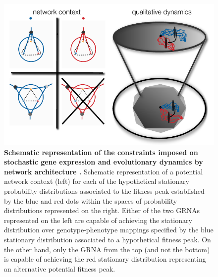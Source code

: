 \begin{figure}[!ht]
\centering
\noindent\includegraphics[width=0.9\columnwidth]{fig/stochdynscheme.pdf}
\caption{{\bf Schematic representation of the constraints imposed on stochastic gene expression and evolutionary dynamics by network architecture .} Schematic representation of a potential network context (left) for each of the hypothetical stationary probability distributions associated to the fitness peak established by the blue and red dots within the spaces of probability distributions represented on the right. Either of the two GRNAs represented on the left are capable of achieving the stationary distribution over genotype-phenotype mappings specified by the blue stationary distribution associated to a hypothetical fitness peak. On the other hand, only the GRNA from the top (and not the bottom) is capable of achieving the red stationary distribution representing an alternative potential fitness peak.}
\label{fig:stochdynscheme}
\end{figure}
